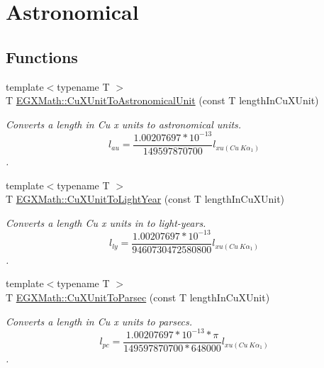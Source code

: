 \hypertarget{group___e_g_x_math-_conversions-_length_conversions-_non-_s_i-_cu_x_unit-_astronomical}{}\section{Astronomical}
\label{group___e_g_x_math-_conversions-_length_conversions-_non-_s_i-_cu_x_unit-_astronomical}
\subsection*{Functions}
\begin{DoxyCompactItemize}
\item 
{\footnotesize template$<$typename T $>$ }\\T \mbox{\hyperlink{group___e_g_x_math-_conversions-_length_conversions-_non-_s_i-_cu_x_unit-_astronomical_ga4e500b2f41ef6b9da3270da104a5b6fa}{E\+G\+X\+Math\+::\+Cu\+X\+Unit\+To\+Astronomical\+Unit}} (const T length\+In\+Cu\+X\+Unit)
\begin{DoxyCompactList}\small\item\em Converts a length in Cu x units to astronomical units. \[ l_{au}= \frac{1.00207697*10^{-13}}{149597870700} l_{xu(Cu\ K\alpha_1)} \]. \end{DoxyCompactList}\item 
{\footnotesize template$<$typename T $>$ }\\T \mbox{\hyperlink{group___e_g_x_math-_conversions-_length_conversions-_non-_s_i-_cu_x_unit-_astronomical_gaf00800997b3a20104d220f4487505cf4}{E\+G\+X\+Math\+::\+Cu\+X\+Unit\+To\+Light\+Year}} (const T length\+In\+Cu\+X\+Unit)
\begin{DoxyCompactList}\small\item\em Converts a length Cu x units in to light-\/years. \[ l_{ly}= \frac{1.00207697*10^{-13}}{9460730472580800} l_{xu(Cu\ K\alpha_1)} \]. \end{DoxyCompactList}\item 
{\footnotesize template$<$typename T $>$ }\\T \mbox{\hyperlink{group___e_g_x_math-_conversions-_length_conversions-_non-_s_i-_cu_x_unit-_astronomical_ga53035d7a668e8d79bdfa0dac5322e554}{E\+G\+X\+Math\+::\+Cu\+X\+Unit\+To\+Parsec}} (const T length\+In\+Cu\+X\+Unit)
\begin{DoxyCompactList}\small\item\em Converts a length in Cu x units to parsecs. \[ l_{pc}=\frac{1.00207697*10^{-13} * \pi}{149597870700 * 648000} l_{xu(Cu\ K\alpha_1)} \]. \end{DoxyCompactList}\end{DoxyCompactItemize}


